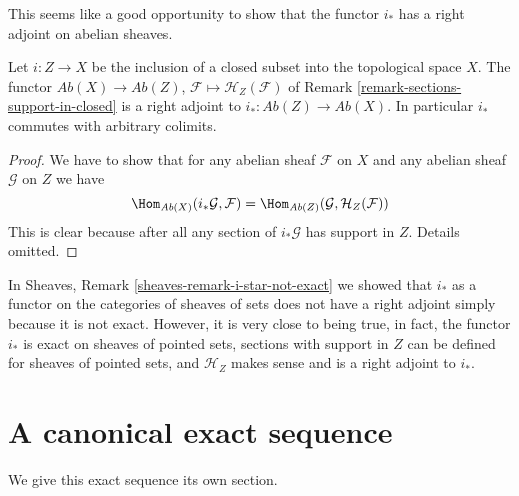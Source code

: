 \noindent
This seems like a good opportunity to show that the functor
$i_*$ has a right adjoint on abelian sheaves.

\begin{lemma}
\label{lemma-i-star-right-adjoint}
Let $i : Z \to X$ be the inclusion of a closed subset into the
topological space $X$. The functor $\textit{Ab}(X) \to \textit{Ab}(Z)$,
$\mathcal{F} \mapsto \mathcal{H}_Z(\mathcal{F})$ of
Remark \ref{remark-sections-support-in-closed}
is a right adjoint to $i_* : \textit{Ab}(Z) \to \textit{Ab}(X)$.
In particular $i_*$ commutes with arbitrary colimits.
\end{lemma}

\begin{proof}
We have to show that for any abelian sheaf $\mathcal{F}$ on $X$ and any
abelian sheaf $\mathcal{G}$ on $Z$ we have
$$
\Hom_{\textit{Ab}(X)}(i_*\mathcal{G}, \mathcal{F}) =
\Hom_{\textit{Ab}(Z)}(\mathcal{G}, \mathcal{H}_Z(\mathcal{F}))
$$
This is clear because after all any section of $i_*\mathcal{G}$
has support in $Z$. Details omitted.
\end{proof}

\begin{remark}
\label{remark-i-star-right-adjoint}
In Sheaves, Remark \ref{sheaves-remark-i-star-not-exact}
we showed that $i_*$ as a functor
on the categories of sheaves of sets
does not have a right adjoint simply because
it is not exact. However, it is very close to being
true, in fact, the functor $i_*$ is exact on sheaves
of pointed sets, sections with support in $Z$ can
be defined for sheaves of pointed sets, and $\mathcal{H}_Z$
makes sense and is a right adjoint to $i_*$.
\end{remark}









\section{A canonical exact sequence}
\label{section-canonical-exact-sequence}

\noindent
We give this exact sequence its own section.

